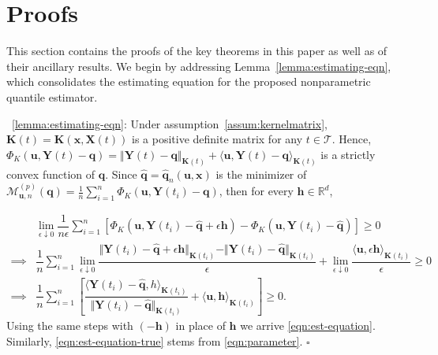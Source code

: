\documentclass[aos]{imsart}
\theoremstyle{plain}
\theoremstyle{remark}
\def\R{\mathbb{R}}
\newcommand{\Mcal}{\mathcal{M}}
\newcommand{\Tcal}{\mathcal{T}}
\newcommand{\bb}[1]{\boldsymbol{#1}}
\newcommand{\kernel}[1]{\bb{K}(\bb{x}, \bb{X}(#1))}
\newcommand{\cnam}[1]{\textcolor{mypurple}{#1}}
\newenvironment{pfofLem}{\noindent{\bf Proof of Lemma}}{\hfill $\square$ \\}
\begin{document}
\section{Proofs}\label{sec:main-proofs}

\cnam{This section contains the proofs of the key theorems in this paper as well as of their ancillary results. We begin by addressing Lemma~\ref{lemma:estimating-eqn}, which consolidates the estimating equation for the proposed nonparametric quantile estimator.}

\medskip
 
\begin{pfofLem}~\ref{lemma:estimating-eqn}:
    \cnam{Under assumption~\ref{assum:kernelmatrix}, $\bb{K}(t) = \kernel{t}$ is a positive definite matrix for any $t \in \Tcal$. Hence, $\Phi_K(\bb{u}, \bb{Y}(t) - \bb{q}) = \Vert \bb{Y}(t) - \bb{q}\Vert_{\bb{K}(t)} + \langle \bb{u}, \bb{Y}(t) - \bb{q}\rangle_{\bb{K}(t)}$ is a strictly convex function of $\bb{q}$.} Since $\widehat{\bb{q}} = \widehat{\bb{q}}_n(\bb{u}, \bb{x})$ is the minimizer of $\Mcal_{\bb{u},n}^{(p)}(\bb{q}) = \frac{1}{n}\sum_{i=1}^n \Phi_K(\bb{u}, \bb{Y}(t_i) - \bb{q})$, then for every $\bb{h} \in \R^d$,

\begin{align*}
    & \lim_{\epsilon \downarrow 0} \dfrac{1}{n\epsilon}\sum_{i=1}^n \left[ \Phi_K(\bb{u}, \bb{Y}(t_i) - \widehat{\bb{q}} + \epsilon \bb{h}) - \Phi_K(\bb{u}, \bb{Y}(t_i) - \widehat{\bb{q}} ) \right] \geqslant 0\\
    \implies & \dfrac{1}{n}\sum_{i=1}^n \lim_{\epsilon \downarrow 0} \dfrac{\Vert \bb{Y}(t_i) - \widehat{\bb{q}} + \epsilon \bb{h} \Vert_{\bb{K}(t_i)} - \Vert \bb{Y}(t_i) - \widehat{\bb{q}} \Vert_{\bb{K}(t_i)} }{ \epsilon } + \lim_{\epsilon \downarrow 0} \dfrac{ \langle \bb{u}, \epsilon \bb{h} \rangle_{\bb{K}(t_i)} }{\epsilon} \geqslant 0\\
    \implies & \dfrac{1}{n}\sum_{i=1}^{n} \left[ \dfrac{\langle \bb{Y}(t_i) - \widehat{\bb{q}}, h\rangle_{\bb{K}(t_i)} }{ \Vert \bb{Y}(t_i) - \widehat{\bb{q}} \Vert_{\bb{K}(t_i)} } + \langle \bb{u}, \bb{h}\rangle_{\bb{K}(t_i)} \right] \geqslant 0.
\end{align*}
\cnam{Using the same steps with $(-\bb{h})$ in place of $\bb{h}$ we arrive \eqref{eqn:est-equation}. Similarly, \eqref{eqn:est-equation-true} stems from \eqref{eqn:parameter}.}
\end{pfofLem}
\end{document}
